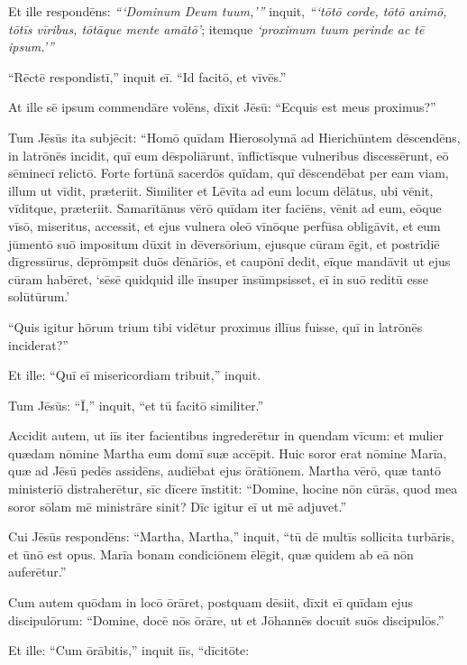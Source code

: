 \Versus Et ille respondēns: \emph{```Dominum Deum tuum,'{}''} inquit, \emph{```tōtō corde, tōtō animō, tōtīs vīribus, tōtāque mente amātō'}; itemque \emph{`proximum tuum perinde ac tē ipsum.'{}''}

\Versus ``Rēctē respondistī,'' inquit eī. ``Id facitō, et vīvēs.''

\Versus At ille sē ipsum commendāre volēns, dīxit Jēsū: ``Ecquis est meus proximus?''

\Versus Tum Jēsūs ita subjēcit: ``Homō quīdam Hierosolymā ad Hierichūntem dēscendēns, in latrōnēs incidit, quī eum dēspoliārunt, īnflīctīsque vulneribus discessērunt, eō sēminecī relictō.
\Versus Forte fortūnā sacerdōs quīdam, quī dēscendēbat per eam viam, illum ut vīdit, præteriit.
\Versus Similiter et Lēvīta ad eum locum dēlātus, ubi vēnit, vīditque, præteriit.
\Versus Samarītānus vērō quīdam iter faciēns, vēnit ad eum, eōque vīsō, miseritus, accessit,
\Versus et ejus vulnera oleō vīnōque perfūsa obligāvit, et eum jūmentō suō impositum dūxit in dēversōrium, ejusque cūram ēgit,
\Versus et postrīdiē dīgressūrus, dēprōmpsit duōs dēnāriōs, et caupōnī dedit, eīque mandāvit ut ejus cūram habēret, `sēsē quidquid ille īnsuper īnsūmpsisset, eī in suō reditū esse solūtūrum.'

\Versus ``Quis igitur hōrum trium tibi vidētur proximus illīus fuisse, quī in latrōnēs inciderat?''

\Versus Et ille: ``Quī eī misericordiam tribuit,'' inquit.

Tum Jēsūs: ``Ī,'' inquit, ``et tū facitō similiter.''

\Versus Accidit autem, ut iīs iter facientibus ingrederētur in quendam vīcum: et mulier quædam nōmine Martha eum domī suæ accēpit.
\Versus Huic soror erat nōmine Marīa, quæ ad Jēsū pedēs assidēns, audiēbat ejus ōrātiōnem.
\Versus Martha vērō, quæ tantō ministeriō distraherētur, sīc dīcere īnstitit: ``Domine, hocine nōn cūrās, quod mea soror sōlam mē ministrāre sinit? Dīc igitur eī ut mē adjuvet.''

\Versus Cui Jēsūs respondēns: ``Martha, Martha,'' inquit, ``tū dē multīs sollicita turbāris,
\Versus et ūnō est opus. Marīa bonam condiciōnem ēlēgit, quæ quidem ab eā nōn auferētur.''


\Caput
\Versus Cum autem quōdam in locō ōrāret, postquam dēsiit, dīxit eī quīdam ejus discipulōrum: ``Domine, docē nōs ōrāre, ut et Jōhannēs docuit suōs discipulōs.''

\Versus Et ille: ``Cum ōrābitis,'' inquit iīs, ``dīcitōte:

